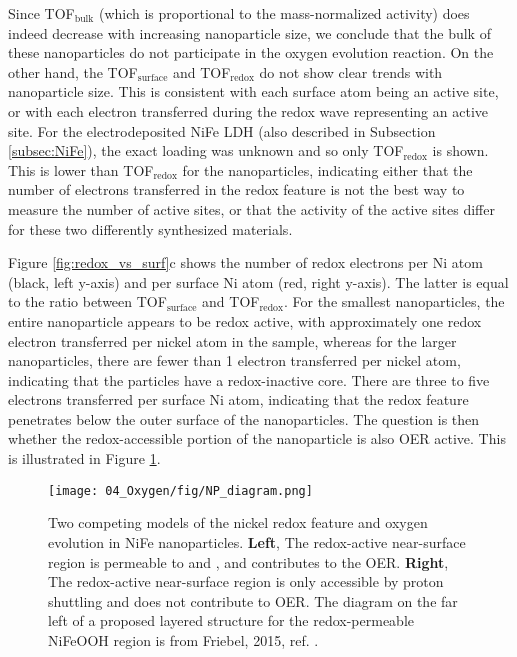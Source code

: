 Since TOF$_{\text{bulk}}$ (which is proportional to the mass-normalized activity) does indeed decrease with increasing nanoparticle size, we conclude that the bulk of these nanoparticles do not participate in the oxygen evolution reaction. On the other hand, the TOF$_{\text{surface}}$ and TOF$_{\text{redox}}$ do not show clear trends with nanoparticle size. This is consistent with each surface atom being an active site, or with each electron transferred during the redox wave representing an active site. For the electrodeposited NiFe LDH (also described in Subsection \ref{subsec:NiFe}), the exact loading was unknown and so only TOF$_{\text{redox}}$ is shown. This is lower than TOF$_{\text{redox}}$ for the nanoparticles, indicating either that the number of electrons transferred in the redox feature is not the best way to measure the number of active sites, or that the activity of the active sites differ for these two differently synthesized materials.

Figure \ref{fig:redox_vs_surf}c shows the number of redox electrons per Ni atom (black, left y-axis) and per surface Ni atom (red, right y-axis). The latter is equal to the ratio between TOF$_{\text{surface}}$ and TOF$_{\text{redox}}$. For the smallest nanoparticles, the entire nanoparticle appears to be redox active, with approximately one redox electron transferred per nickel atom in the sample, whereas for the larger nanoparticles, there are fewer than 1 electron transferred per nickel atom, indicating that the particles have a redox-inactive core. There are three to five electrons transferred per surface Ni atom, indicating that the redox feature penetrates below the outer surface of the nanoparticles. The question is then whether the redox-accessible portion of the nanoparticle is also OER active. This is illustrated in Figure \ref{fig:NP_diagram}.

\begin{figure}[h!]
	\centering
	\texttt{[image: 04\_Oxygen/fig/NP\_diagram.png]}
	\caption{Two competing models of the nickel redox feature and oxygen evolution in NiFe nanoparticles. \textbf{Left}, The redox-active near-surface region is permeable to  and , and contributes to the OER. \textbf{Right}, The redox-active near-surface region is only accessible by proton shuttling and does not contribute to OER. The diagram on the far left of a proposed layered structure for the redox-permeable NiFeOOH region is from Friebel, 2015, ref. .}
	\label{fig:NP_diagram}
\end{figure}

